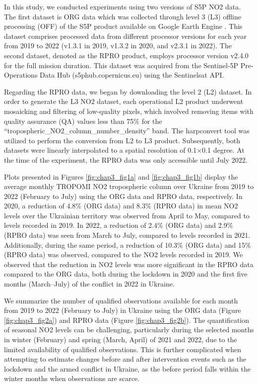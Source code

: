 In this study, we conducted experiments using two versions of S5P NO2 data. The first dataset is ORG data which was collected through level 3 (L3) offline processing (OFF) of the S5P product available on Google Earth Engine \citep{gorelick2017google}. This dataset comprises processed data from different processor versions for each year from 2019 to 2022 (v1.3.1 in 2019, v1.3.2 in 2020, and v2.3.1 in 2022). The second dataset, denoted as the RPRO product, employs processor version v2.4.0 for the full mission duration. This dataset was acquired from the Sentinel-5P Pre-Operations Data Hub (s5phub.copernicus.eu) using the Sentinelsat API.\par

Regarding the RPRO data, we began by downloading the level 2 (L2) dataset. In order to generate the L3 NO2 dataset, each operational L2 product underwent mosaicking and filtering of low-quality pixels, which involved removing items with quality assurance (QA) values less than 75\% for the \enquote{tropospheric\_NO2\_column\_number\_density} band. The harpconvert tool was utilized to perform the conversion from L2 to L3 product. Subsequently, both datasets were linearly interpolated to a spatial resolution of 0.1$\times$0.1 degree. At the time of the experiment, the RPRO data was only accessible until July 2022.\par

Plots presented in Figures \ref{fig:chap3_fig1a} and \ref{fig:chap3_fig1b} display the average monthly TROPOMI NO2 tropospheric column over Ukraine from 2019 to 2022 (February to July) using the ORG data and RPRO data, respectively. In 2020, a reduction of 4.8\% (ORG data) and 8.3\% (RPRO data) in mean NO2 levels over the Ukrainian territory was observed from April to May, compared to levels recorded in 2019. In 2022, a reduction of 2.4\% (ORG data) and 2.9\% (RPRO data) was seen from March to July, compared to levels recorded in 2021. Additionally, during the same period, a reduction of 10.3\% (ORG data) and 15\% (RPRO data) was observed, compared to the NO2 levels recorded in 2019. We observed that the reduction in NO2 levels was more significant in the RPRO data compared to the ORG data, both during the lockdown in 2020 and the first five months (March–July) of the conflict in 2022 in Ukraine.\par

We summarize the number of qualified observations available for each month from 2019 to 2022 (February to July) in Ukraine using the ORG data (Figure \ref{fig:chap3_fig2a}) and RPRO data (Figure \ref{fig:chap3_fig2b}). The quantification of seasonal NO2 levels can be challenging, particularly during the selected months in winter (February) and spring (March, April) of 2021 and 2022, due to the limited availability of qualified observations. This is further complicated when attempting to estimate changes before and after intervention events such as the lockdown and the armed conflict in Ukraine, as the before period falls within the winter months when observations are scarce.\par

